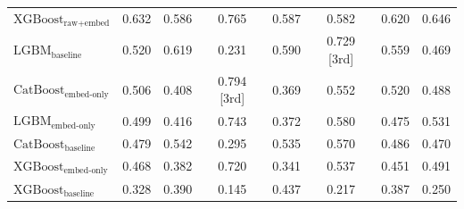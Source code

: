 \begin{table}[ht]
{\begin{tabular}{lccccccc}
$\text{XGBoost}_{\text{raw+embed}}$ & 0.632 & 0.586 & 0.765 & 0.587 & 0.582 & 0.620 & 0.646 \\
$\text{LGBM}_{\text{baseline}}$ & 0.520 & 0.619 & 0.231 & 0.590 & 0.729 [3rd] & 0.559 & 0.469 \\
$\text{CatBoost}_{\text{embed-only}}$ & 0.506 & 0.408 & 0.794 [3rd] & 0.369 & 0.552 & 0.520 & 0.488 \\
$\text{LGBM}_{\text{embed-only}}$ & 0.499 & 0.416 & 0.743 & 0.372 & 0.580 & 0.475 & 0.531 \\
$\text{CatBoost}_{\text{baseline}}$ & 0.479 & 0.542 & 0.295 & 0.535 & 0.570 & 0.486 & 0.470 \\
$\text{XGBoost}_{\text{embed-only}}$ & 0.468 & 0.382 & 0.720 & 0.341 & 0.537 & 0.451 & 0.491 \\
$\text{XGBoost}_{\text{baseline}}$ & 0.328 & 0.390 & 0.145 & 0.437 & 0.217 & 0.387 & 0.250 \\
\bottomrule
\end{tabular}%
}
\end{table}